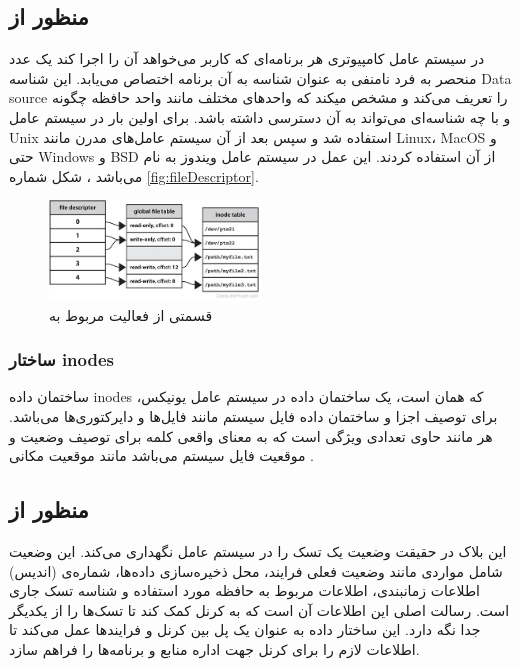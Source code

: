 \documentclass[10pt, a4paper]{article}
\begin{document}
\subsection{منظور از }

در سیستم عامل کامپیوتری هر برنامه‌ای که کاربر می‌خواهد آن را اجرا کند یک عدد
منحصر به فرد نامنفی به عنوان شناسه به آن برنامه اختصاص می‌یابد. این شناسه Data
source را تعریف می‌کند و مشخص میکند که واحد‌های مختلف مانند واحد حافظه چگونه و
با چه شناسه‌ای می‌تواند به آن دسترسی داشته باشد.  برای اولین
بار در سیستم عامل Unix استفاده شد و سپس بعد از آن سیستم عامل‌های مدرن مانند
Linux، MacOS و حتی Windows و BSD از آن استفاده کردند. این عمل در سیستم عامل
ویندوز به نام  می‌باشد \cite{filedescriptor}، شکل شماره
\ref{fig:fileDescriptor}.

\begin{figure}[H]
    \centering
    \includegraphics[width=0.5\textwidth]{figs/file_descriptor.png}
    \caption{قسمتی از فعالیت مربوط به }
    \label{fig:filedescriptor}
\end{figure}

\subsubsection{ساختار inodes}

ساختمان داده inodes که همان  است، یک ساختمان داده در سیستم عامل
یونیکس، برای توصیف اجزا و ساختمان داده فایل سیستم مانند فایل‌ها و دایرکتوری‌ها
می‌باشد. هر  مانند  حاوی تعدادی ویژگی است که به
معنای واقعی کلمه برای توصیف وضعیت و موقعیت فایل سیستم می‌باشد مانند موقعیت مکانی
.

\subsection{منظور از }

این بلاک در حقیقت وضعیت یک تسک را در سیستم عامل نگهداری می‌کند. این وضعیت شامل
مواردی مانند وضعیت فعلی فرایند، محل ذخیره‌سازی داده‌ها، شماره‌ی (اندیس) اطلاعات
زمانبندی، اطلاعات مربوط به حافظه مورد استفاده و شناسه تسک جاری است. رسالت اصلی
این اطلاعات آن است که به کرنل کمک کند تا تسک‌ها را از یکدیگر جدا نگه دارد. این
ساختار داده به عنوان یک پل بین کرنل و فرایند‌ها عمل می‌کند تا اطلاعات لازم را
برای کرنل جهت اداره منابع و برنامه‌ها را فراهم سازد.
\end{document}

